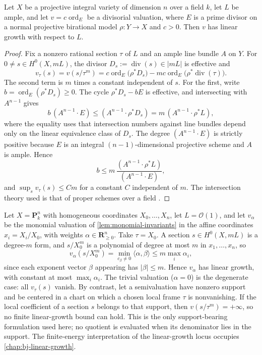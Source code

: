 \begin{lemma}\label{lem:divisorial-linear-growth}
Let $X$ be a projective integral variety of dimension $n$ over a field
$k$, let $L$ be ample, and let $v=c\operatorname{ord}_E$ be a divisorial
valuation, where $E$ is a prime divisor on a normal projective birational
model $\rho:Y\to X$ and $c>0$. Then $v$ has linear growth with respect to
$L$.
\end{lemma}
\begin{proof}
Fix a nonzero rational section $\tau$ of $L$ and an ample line bundle $A$
on $Y$. For $0\neq s\in H^0(X,mL)$, the divisor
$D_s:=\operatorname{div}(s)\in|mL|$ is effective and
\[
 v_\tau(s)=v(s/\tau^m)
 =c\operatorname{ord}_E\bigl(\rho^*D_s\bigr)
 -mc\operatorname{ord}_E\bigl(\rho^*\operatorname{div}(\tau)\bigr).
\]
The second term is $m$ times a constant independent of $s$. For the
first, write $b=\operatorname{ord}_E(\rho^*D_s)\geq0$. The cycle
$\rho^*D_s-bE$ is effective, and intersecting with $A^{n-1}$ gives
\[
 b\,(A^{n-1}\cdot E)\leq(A^{n-1}\cdot\rho^*D_s)
 =m\,(A^{n-1}\cdot\rho^*L),
\]
where the equality uses that intersection numbers against line bundles
depend only on the linear equivalence class of $D_s$. The degree
$(A^{n-1}\cdot E)$ is strictly positive because $E$ is an integral
$(n-1)$-dimensional projective scheme and $A$ is ample. Hence
\[
 b\leq m\,\frac{(A^{n-1}\cdot\rho^*L)}{(A^{n-1}\cdot E)},
\]
and $\sup_{s}v_\tau(s)\leq Cm$ for a constant $C$ independent of $m$.
The intersection theory used is that of proper schemes over a field
\cite[Chapter~2]{Ful}.
\end{proof}

\begin{example}
\label{ex:monomial-linear-growth}
Let $X=\mathbf P^n_k$ with homogeneous coordinates $X_0,\ldots,X_n$, let
$L=\mathcal O(1)$, and let $v_\alpha$ be the monomial valuation of
\cref{lem:monomial-invariants} in the affine coordinates $x_i=X_i/X_0$,
with weights $\alpha\in\mathbf R_{\geq0}^n$. Take
$\tau=X_0$. A section $s\in H^0(X,m L)$ is a degree-$m$ form, and
$s/X_0^m$ is a polynomial of degree at most $m$ in $x_1,\ldots,x_n$, so
\[
 v_\alpha(s/X_0^m)
 =\min_{c_\beta\neq0}\langle\alpha,\beta\rangle
 \leq m\max_i\alpha_i ,
\]
since each exponent vector $\beta$ appearing has $|\beta|\leq m$.
Hence $v_\alpha$ has linear growth, with constant at most
$\max_i\alpha_i$. The trivial valuation ($\alpha=0$) is the degenerate
case: all $v_\tau(s)$ vanish. By contrast, let a semivaluation have nonzero
support and be centered in a chart on which a chosen local frame $\tau$ is
nonvanishing.  If the local coefficient of a section $s$ belongs to that
support, then $v(s/\tau^m)=+\infty$, so no finite linear-growth bound can
hold.  This is the only support-bearing formulation used here; no quotient
is evaluated when its denominator lies in the support. The finite-energy interpretation of the linear-growth locus
occupies \cref{chap:bj-linear-growth}.
\end{example}

